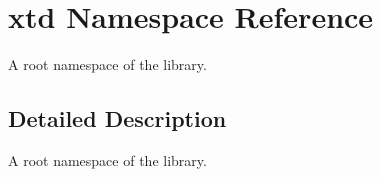\hypertarget{namespacextd}{\section{xtd Namespace Reference}
\label{namespacextd}
}


A root namespace of the library.  




\subsection{Detailed Description}
A root namespace of the library. 